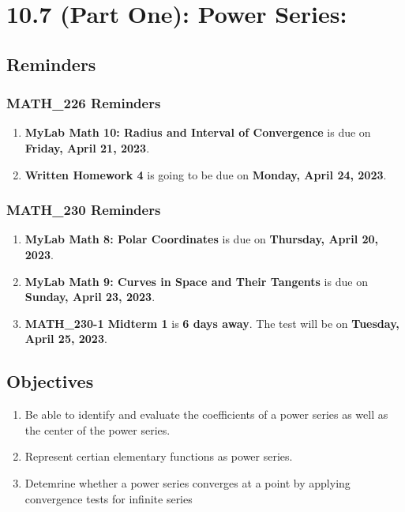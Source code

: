 \chapter{10.7 (Part One): Power Series: }
\section{Reminders}
\subsection{MATH\_226 Reminders}
\begin{enumerate}
  \item \textbf{MyLab Math 10: Radius and Interval
        of Convergence} is due on \textbf{Friday, April 21,
        2023}.
  \item \textbf{Written Homework 4} is going
        to be due on \textbf{Monday, April 24, 2023}.
\end{enumerate}
\subsection{MATH\_230 Reminders}
\begin{enumerate}
  \item \textbf{MyLab Math 8: Polar Coordinates } is due
        on \textbf{Thursday, April 20, 2023}.
  \item \textbf{MyLab Math 9: Curves in Space and
        Their Tangents} is due on \textbf{Sunday, April
        23, 2023}.
  \item \textbf{MATH\_230-1 Midterm 1} is \textbf{6 days away}. The test will be on \textbf{Tuesday,
        April 25, 2023}.
\end{enumerate}


\section{Objectives}
\begin{enumerate}
  \item Be able to identify and evaluate the coefficients
        of a power series as well as the center of
        the power series.
  \item Represent certian elementary functions as power
        series.
  \item Detemrine whether a power series
        converges at a point by applying convergence
        tests for infinite series
\end{enumerate}

